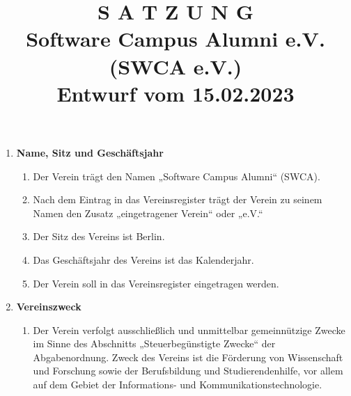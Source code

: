 \documentclass{article}
\title{\textsf{\textbf{S A T Z U N G}}\\
\small\textbf{Software Campus Alumni e.V. (SWCA e.V.)}\\
Entwurf vom 15.02.2023}
\author{}
\date{}
\begin{document}
\maketitle

\begin{enumerate}[§ 1.]

\item \textsf{\textbf{Name, Sitz und Geschäftsjahr}}
	\begin{enumerate}[1.]
	\item Der Verein trägt den Namen „Software Campus Alumni“ (SWCA).
	\item Nach dem Eintrag in das Vereinsregister trägt der Verein zu seinem Namen den Zusatz „eingetragener Verein“ oder „e.V.“
	\item Der Sitz des Vereins ist Berlin.
	\item Das Geschäftsjahr des Vereins ist das Kalenderjahr.
	\item Der Verein soll in das Vereinsregister eingetragen werden.
	\end{enumerate}

\item \textsf{\textbf{Vereinszweck}}
	\begin{enumerate}[1.]
	\item Der Verein verfolgt ausschließlich und unmittelbar gemeinnützige Zwecke im Sinne des Abschnitts „Steuerbegünstigte Zwecke“ der Abgabenordnung.
	Zweck des Vereins ist die Förderung von Wissenschaft und Forschung sowie der Berufsbildung und Studierendenhilfe, vor allem auf dem Gebiet der Informations- und Kommunikationstechnologie.


\end{enumerate}
\end{enumerate}
\end{document}
